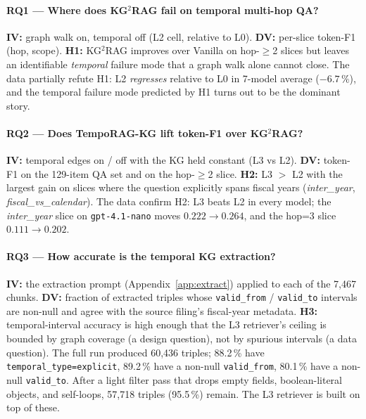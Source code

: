\documentclass[11pt]{article}
\begin{document}
\paragraph{RQ1 --- Where does KG$^{2}$RAG fail on temporal multi-hop QA?}
\textbf{IV:} graph walk on, temporal off (L2 cell, relative to L0).
\textbf{DV:} per-slice token-F1 (hop, scope). \textbf{H1:} KG$^{2}$RAG
improves over Vanilla on hop-$\geq$2 slices but leaves an identifiable
\emph{temporal} failure mode that a graph walk alone cannot close.
The data partially refute H1: L2 \emph{regresses} relative to L0 in
7-model average ($-6.7\,\%$), and the temporal failure mode predicted
by H1 turns out to be the dominant story.

\paragraph{RQ2 --- Does TempoRAG-KG lift token-F1 over KG$^{2}$RAG?}
\textbf{IV:} temporal edges on / off with the KG held constant
(L3 vs L2). \textbf{DV:} token-F1 on the 129-item QA set and on the
hop-$\geq$2 slice. \textbf{H2:} L3 $>$ L2 with the largest gain on
slices where the question explicitly spans fiscal years
(\textit{inter\_year}, \textit{fiscal\_vs\_calendar}).
The data confirm H2: L3 beats L2 in every model; the
\textit{inter\_year} slice on \texttt{gpt-4.1-nano} moves
$0.222\!\to\!0.264$, and the hop=3 slice $0.111\!\to\!0.202$.

\paragraph{RQ3 --- How accurate is the temporal KG extraction?}
\textbf{IV:} the extraction prompt (Appendix~\ref{app:extract}) applied
to each of the 7{,}467 chunks. \textbf{DV:} fraction of extracted
triples whose \texttt{valid\_from} / \texttt{valid\_to} intervals are
non-null and agree with the source filing's fiscal-year metadata.
\textbf{H3:} temporal-interval accuracy is high enough that the L3
retriever's ceiling is bounded by graph coverage (a design question),
not by spurious intervals (a data question). The full run produced
60{,}436 triples; 88.2\,\% have \texttt{temporal\_type=explicit},
89.2\,\% have a non-null \texttt{valid\_from}, 80.1\,\% have a non-null
\texttt{valid\_to}. After a light filter pass that drops empty fields,
boolean-literal objects, and self-loops, 57{,}718 triples (95.5\,\%)
remain. The L3 retriever is built on top of these.
\end{document}
